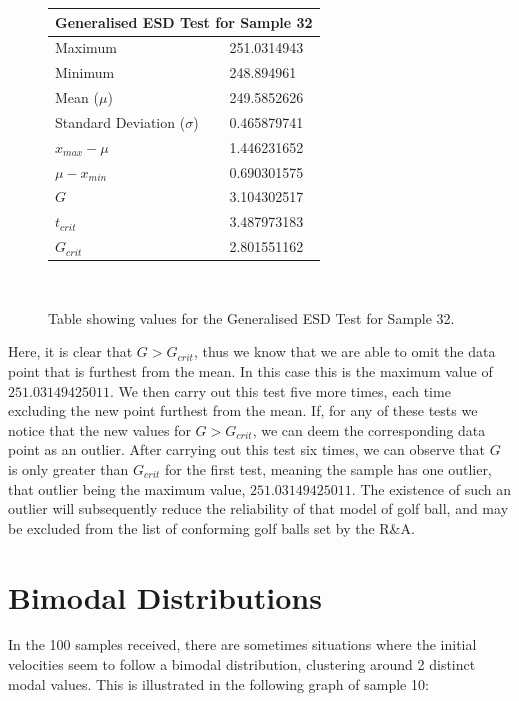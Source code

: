 \documentclass[11pt]{article}
\begin{document}
 \begin{figure} [H]
\begin{center}
\begin{tabular}{ |l|l| } 
\hline
\multicolumn{2}{|c|}{Generalised ESD Test for Sample 32} \\
\hline
\hline
 Maximum & 251.0314943  \\ 
  \hline
 Minimum & 248.894961  \\
  \hline
 Mean ($\mu$) & 249.5852626  \\ 
 \hline
  Standard Deviation ($\sigma$) & 0.465879741 \\
 \hline
 $x_{max} - \mu $ & 1.446231652 \\
 \hline
 $ \mu - x_{min}$ & 0.690301575 \\
 \hline
 $G$ & 3.104302517 \\
 \hline
 $t_{crit}$ & 3.487973183 \\
 \hline
 $G_{crit}$ & 2.801551162 \\
 \hline
 \end{tabular}
 \\
 \caption{Table showing values for the Generalised ESD Test for Sample 32.}
\label{tab:ESD Test of Sample 32}
 \end{center}
 \end{figure} 

Here, it is clear that $G > G_{crit}$, thus we know that we are able to omit the data point that is furthest from the mean. In this case this is the maximum value of $251.03149425011$. We then carry out this test five more times, each time excluding the new point furthest from the mean. If, for any of these tests we notice that the new values for $G > G_{crit}$, we can deem the corresponding data point as an outlier. After carrying out this test six times, we can observe that $G$ is only greater than $G_{crit}$ for the first test, meaning the sample has one outlier, that outlier being the maximum value, $251.03149425011$. The existence of such an outlier will subsequently reduce the reliability of that model of golf ball, and may be excluded from the list of conforming golf balls set by the R\&A.


\section{Bimodal Distributions}


In the 100 samples received, there are sometimes situations where the initial velocities seem to follow a bimodal distribution, clustering around 2 distinct modal values. This is illustrated in the following graph of sample 10:
\end{document}
